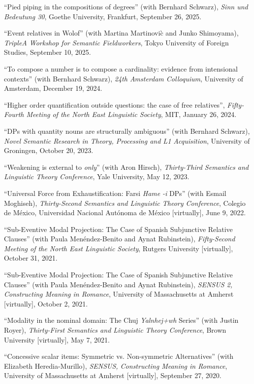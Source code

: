 \documentclass[11pt]{article}
\begin{document}
``Pied piping in the compositions of degrees'' (with Bernhard Schwarz), \textit{Sinn und Bedeutung 30}, Goethe University, Frankfurt, September 26, 2025.

``Event relatives in Wolof'' (with Martina Martinovi\`{c} and Junko Shimoyama),  \textit{TripleA Workshop for Semantic Fieldworkers}, Tokyo University of Foreign Studies, September 10, 2025.

``To compose a number is to compose a cardinality: evidence from intensional contexts'' (with Bernhard Schwarz), \textit{24th Amsterdam Colloquium}, University of Amsterdam, December 19, 2024.

``Higher order quantification outside questions: the case of free relatives'', \textit{Fifty-Fourth
  Meeting of the North East Linguistic Society}, MIT, January 26, 2024.

``DPs with quantity nouns are structurally ambiguous'' (with Bernhard Schwarz), \textit{Novel Semantic Research in Theory, Processing and L1 Acquisition}, University of Groningen, October 20, 2023.

``Weakening is external to \textit{only}'' (with Aron Hirsch), \textit{Thirty-Third Semantics and Linguistic Theory Conference}, Yale University, May 12, 2023.

``Universal Force from Exhaustification:
Farsi \textit{Hame} \textit{-i} DPs'' (with Esmail Moghiseh), \textit{Thirty-Second Semantics and Linguistic Theory Conference}, Colegio de M\'exico, Universidad Nacional Aut\'onoma de M\'exico [virtually], June 9, 2022.

``Sub-Eventive Modal Projection:
The Case of Spanish Subjunctive Relative Clauses'' (with Paula Men\'endez-Benito and Aynat Rubinstein), \textit{Fifty-Second Meeting of the North East Linguistic Society}, Rutgers University [virtually], October 31, 2021.


``Sub-Eventive Modal Projection:
The Case of Spanish Subjunctive Relative Clauses'' (with Paula Men\'endez-Benito and Aynat Rubinstein), \textit{SENSUS 2, Constructing Meaning in Romance}, University of Massachusetts at Amherst [virtually], October 2, 2021.

``Modality in the nominal domain: The Chuj \textit{Yalnhej+wh} Series'' (with Justin Royer), \textit{Thirty-First Semantics and Linguistic Theory Conference}, Brown University [virtually], May 7, 2021.

``Concessive scalar items: Symmetric vs. Non-symmetric Alternatives'' (with Elizabeth Heredia-Murillo), \textit{SENSUS, Constructing Meaning in Romance}, University of Massachusetts at Amherst [virtually], September 27, 2020.
\end{document}
